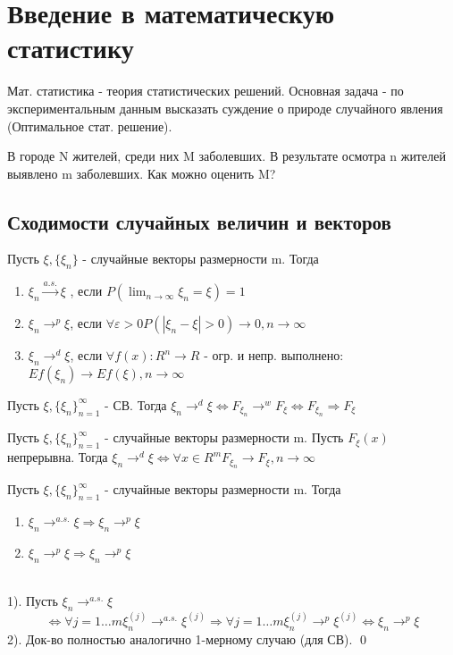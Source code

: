\documentclass{article}
\begin{document}
 
	\section{Введение в математическую статистику}
	Мат. статистика - теория статистических решений.
	Основная задача - по экспериментальным данным высказать суждение о природе случайного явления (Оптимальное стат. решение).\\
	\begin{example}
		В городе N жителей, среди них M заболевших. В результате осмотра n жителей выявлено m заболевших. Как можно оценить M?
	\end{example}
	
	\subsection{Сходимости случайных величин и векторов}
	Пусть $\xi,\{\xi_n\}$ - случайные векторы размерности m. Тогда 
	\begin{enumerate}
		\item $\xi_n \xrightarrow{a.s.} \xi$ , если $P(\lim_{n\to\infty}\xi_n = \xi) = 1$
		\item $\xi_n \to^p \xi$, если $\forall \varepsilon > 0 P(|\xi_n - \xi| > 0) \to 0, n \to \infty$
		\item $\xi_n \to^d \xi$, если $\forall f(x):R^n\to R$ - огр. и непр. выполнено: $Ef(\xi_n) \to Ef(\xi), n \to\infty$
	\end{enumerate}
	
	\begin{theorem}
		Пусть $\xi, \{\xi_n\}_{n=1}^{\infty}$ - СВ.
		Тогда $\xi_n \to^d \xi \Leftrightarrow F_{\xi_n} \to^w F_\xi \Leftrightarrow F_{\xi_n} \Rightarrow F_\xi$ 
	\end{theorem}	
	
	\begin{theorem}
		Пусть $\xi, \{\xi_n\}_{n=1}^{\infty}$ - случайные векторы размерности m. Пусть $F_\xi(x)$ непрерывна. 
		Тогда $\xi_n \to^d \xi \Leftrightarrow \forall x \in R^m F_{\xi_n} \to F_\xi, n \to \infty$
	\end{theorem}
	
	\begin{theorem}
		Пусть $\xi, \{\xi_n\}_{n=1}^{\infty}$ - случайные векторы размерности m. Тогда
		\begin{enumerate}
			\item $\xi_n \to^{a.s.} \xi \Rightarrow \xi_n \to^p \xi$
			\item $\xi_n \to^p \xi \Rightarrow \xi_n \to^p \xi$
		\end{enumerate}
		\proof\\
		1). Пусть $\xi_n \to^{a.s.} \xi$ 
		$$ \Leftrightarrow \forall j=1\ldots m \xi_n^{(j)} \to^{a.s.} \xi^{(j)} \Rightarrow \forall j=1\ldots m \xi_n^{(j)} \to^p \xi^{(j)} \Leftrightarrow \xi_n \to^p \xi$$
		2). Док-во полностью аналогично 1-мерному случаю (для СВ).
		\qed
	\end{theorem}
	
\end{document}
